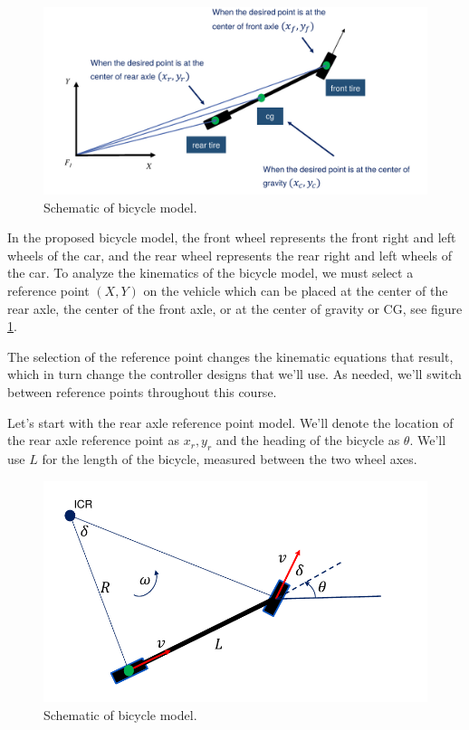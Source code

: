 \begin{figure}[!htb]
\begin{center}
\includegraphics[scale=0.290]{img/bicycle_model/bicycle_model_1.jpeg}
\end{center}
\caption{Schematic of bicycle model.}
\label{bicycle_model_1}
\end{figure}


In the proposed bicycle model, the front wheel represents the front right and left wheels of the car, and the rear wheel represents the rear right and left wheels of the car. 
To analyze the kinematics of the bicycle model, we must select a reference point $(X, Y)$ on the vehicle which can be placed at the center of the rear axle, the center of the front axle, or at the center of gravity or CG, see figure \ref{bicycle_model_1}. 

The selection of the reference point changes the kinematic equations that result, which in turn change the controller designs that we'll use. As needed, we'll switch between reference points throughout this course. 


Let's start with the rear axle reference point model. We'll denote the location of the rear axle reference point as $x_r, y_r$ and the heading of the bicycle as $\theta$. We'll use $L$ for the length of the bicycle, measured between the two wheel axes. 

\begin{figure}[!htb]
\begin{center}
\includegraphics[scale=0.290]{img/bicycle_model/bicycle_model_2.jpeg}
\end{center}
\caption{Schematic of bicycle model.}
\label{bicycle_model_2}
\end{figure}


